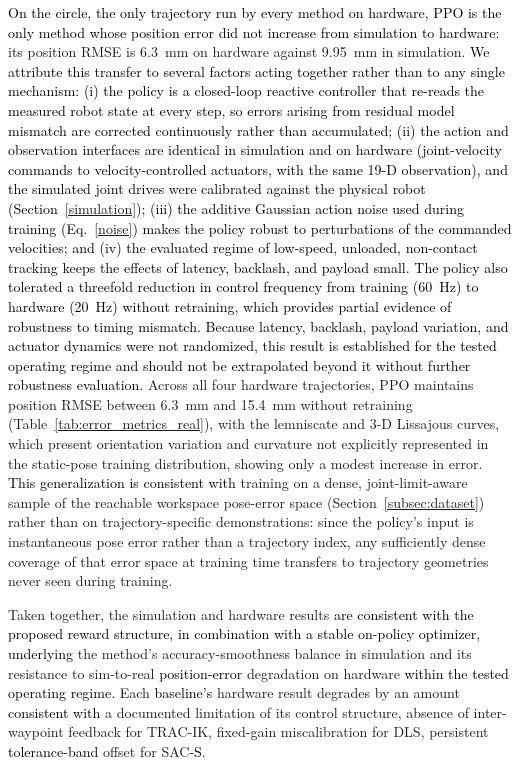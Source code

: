 \documentclass[preprint,12pt]{elsarticle}
\begin{document}
\textcolor{black}{On the circle, the only trajectory run by every method on hardware, PPO is the only method whose position error did not increase from simulation to hardware}: its position RMSE is 6.3~mm on hardware against 9.95~mm in simulation. \textcolor{black}{We attribute this transfer to several factors acting together rather than to any single mechanism: (i) the policy is a closed-loop reactive controller that re-reads the measured robot state at every step, so errors arising from residual model mismatch are corrected continuously rather than accumulated; (ii) the action and observation interfaces are identical in simulation and on hardware (joint-velocity commands to velocity-controlled actuators, with the same 19-D observation), and the simulated joint drives were calibrated against the physical robot (Section~\ref{simulation}); (iii) the additive Gaussian action noise used during training (Eq.~\eqref{noise}) makes the policy robust to perturbations of the commanded velocities; and (iv) the evaluated regime of low-speed, unloaded, non-contact tracking keeps the effects of latency, backlash, and payload small. The policy also tolerated a threefold reduction in control frequency from training (60~Hz) to hardware (20~Hz) without retraining, which provides partial evidence of robustness to timing mismatch. Because latency, backlash, payload variation, and actuator dynamics were not randomized, this result is established for the tested operating regime and should not be extrapolated beyond it without further robustness evaluation.} Across all four hardware trajectories, PPO maintains position RMSE between 6.3~mm and 15.4~mm without retraining (Table~\ref{tab:error_metrics_real}), with the lemniscate and 3-D Lissajous curves, which present orientation variation and curvature not
explicitly represented in the static-pose training distribution,
showing only a modest increase in error. \textcolor{black}{This generalization is consistent with} training on a dense, joint-limit-aware sample of the
reachable workspace pose-error space (Section~\ref{subsec:dataset}) rather than on trajectory-specific demonstrations: since the policy's input is
instantaneous pose error rather than a trajectory index, any sufficiently
dense coverage of that error space at training time transfers to
trajectory geometries never seen during training.

Taken together, the simulation and hardware results \textcolor{black}{are consistent with the proposed reward structure, in combination with a stable on-policy optimizer, underlying} the method's accuracy-smoothness balance in simulation and its resistance to sim-to-real \textcolor{black}{position-error} degradation on hardware \textcolor{black}{within the tested operating regime}. Each \textcolor{black}{baseline's} hardware result degrades by an amount \textcolor{black}{consistent with} a documented limitation of its control structure, absence of inter-waypoint feedback for TRAC-IK, fixed-gain miscalibration for DLS, persistent \textcolor{black}{tolerance-band} offset for SAC\textcolor{black}{-S}.
\end{document}
